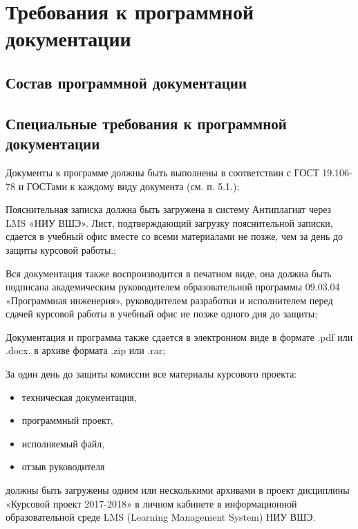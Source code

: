 \section{Требования к программной документации}

\subsection{Состав программной документации}



\subsection{Специальные требования к программной документации}

Документы к программе должны быть выполнены в соответствии с ГОСТ 19.106-78 и ГОСТами к каждому виду документа (см. п. 5.1.);

Пояснительная записка должна быть загружена в систему Антиплагиат через LMS «НИУ ВШЭ». Лист, подтверждающий загрузку пояснительной записки, сдается в учебный офис вместе со всеми материалами не позже, чем за день до защиты курсовой работы.;

Вся документация также воспроизводится в печатном виде, она должна быть подписана академическим руководителем образовательной программы 09.03.04 «Программная инженерия», руководителем разработки и исполнителем перед сдачей курсовой работы в учебный офис не позже одного дня до защиты;

Документация и программа также сдается в электронном виде в формате .pdf или .docx. в архиве формата .zip или .rar;

За один день до защиты комиссии все материалы курсового проекта:
\begin{itemize}
    \item техническая документация,
    \item программный проект,
    \item исполняемый файл,
    \item отзыв руководителя
\end{itemize}
должны быть загружены одним или несколькими архивами в проект дисциплины «Курсовой проект 2017-2018» в личном кабинете в информационной образовательной среде LMS (Learning Management System) НИУ ВШЭ.